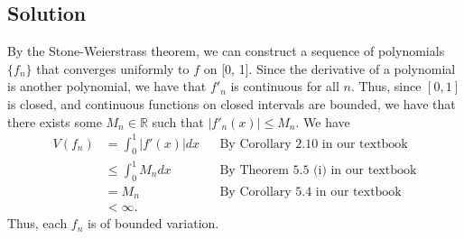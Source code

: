 \documentclass[10pt,a4paper]{article}
\theoremstyle{theorem}
\theoremstyle{definition}
\begin{document}
\subsection*{Solution}
By the Stone-Weierstrass theorem, we can construct a sequence of polynomials $\{f_n\}$ that converges uniformly to $f$ on [0, 1]. Since the derivative of a polynomial is another polynomial, we have that $f'_n$ is continuous for all $n$. Thus, since $[0, 1]$ is closed, and continuous functions on closed intervals are bounded, we have that there exists some $M_n \in \mathbb{R}$ such that $|f'_n(x)| \leq M_n$. We have
\begin{align*}
V(f_n) &= \int_0^1 |f'(x)| dx &&\text{By Corollary 2.10 in our textbook}\\
&\leq \int_0^1 M_n dx &&\text{By Theorem 5.5 (i) in our textbook}\\
&= M_n &&\text{By Corollary 5.4 in our textbook}\\
&< \infty.
\end{align*}
Thus, each $f_n$ is of bounded variation.
\end{document}

